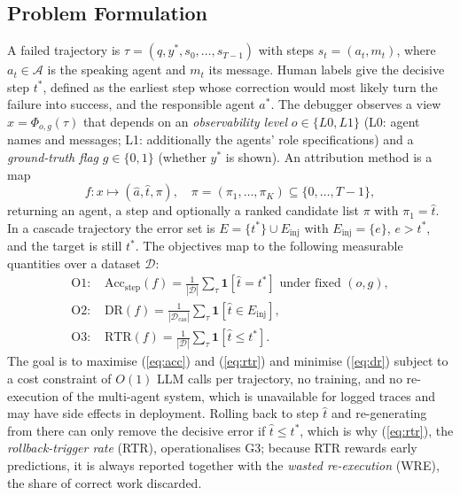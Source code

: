 \documentclass[conference]{IEEEtran}
\begin{document}
\subsection{Problem Formulation}
A failed trajectory is $\tau=(q,y^*,s_0,\dots,s_{T-1})$ with steps $s_t=(a_t,m_t)$, where $a_t\in\mathcal{A}$ is the speaking agent and $m_t$ its message. Human labels give the decisive step $t^*$, defined as the earliest step whose correction would most likely turn the failure into success, and the responsible agent $a^*$. The debugger observes a view $x=\Phi_{o,g}(\tau)$ that depends on an \emph{observability level} $o\in\{L0,L1\}$ (L0: agent names and messages; L1: additionally the agents' role specifications) and a \emph{ground-truth flag} $g\in\{0,1\}$ (whether $y^*$ is shown). An attribution method is a map
\begin{equation}
f: x \mapsto (\hat a,\hat t,\pi),\quad \pi=(\pi_1,\dots,\pi_K)\subseteq\{0,\dots,T{-}1\},
\end{equation}
returning an agent, a step and optionally a ranked candidate list $\pi$ with $\pi_1=\hat t$. In a cascade trajectory the error set is $E=\{t^*\}\cup E_{\text{inj}}$ with $E_{\text{inj}}=\{e\}$, $e>t^*$, and the target is still $t^*$. The objectives map to the following measurable quantities over a dataset $\mathcal{D}$:
\begin{align}
\text{O1: } &\mathrm{Acc}_{\text{step}}(f)=\tfrac{1}{|\mathcal{D}|}\textstyle\sum_\tau \mathbf{1}[\hat t=t^*] \text{ under fixed } (o,g),\label{eq:acc}\\
\text{O2: } &\mathrm{DR}(f)=\tfrac{1}{|\mathcal{D}_{\text{cas}}|}\textstyle\sum_\tau \mathbf{1}[\hat t\in E_{\text{inj}}],\label{eq:dr}\\
\text{O3: } &\mathrm{RTR}(f)=\tfrac{1}{|\mathcal{D}|}\textstyle\sum_\tau \mathbf{1}[\hat t\le t^*].\label{eq:rtr}
\end{align}
The goal is to maximise (\ref{eq:acc}) and (\ref{eq:rtr}) and minimise (\ref{eq:dr}) subject to a cost constraint of $O(1)$ LLM calls per trajectory, no training, and no re-execution of the multi-agent system, which is unavailable for logged traces and may have side effects in deployment. Rolling back to step $\hat t$ and re-generating from there can only remove the decisive error if $\hat t\le t^*$, which is why (\ref{eq:rtr}), the \emph{rollback-trigger rate} (RTR), operationalises G3; because RTR rewards early predictions, it is always reported together with the \emph{wasted re-execution} (WRE), the share of correct work discarded.
\end{document}
